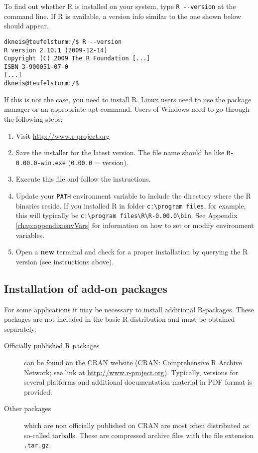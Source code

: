 To find out whether R is installed on your system, type \verb!R --version! at the command line. If R is available, a version info similar to the one shown below should appear.
\begin{lstlisting}[style=shell]
dkneis@teufelsturm:/$ R --version
R version 2.10.1 (2009-12-14)
Copyright (C) 2009 The R Foundation [...]
ISBN 3-900051-07-0
[...]
dkneis@teufelsturm:/$
\end{lstlisting}

If this is not the case, you need to install R. Linux users need to use the package manager or an appropriate apt-command. Users of Windows need to go through the following steps:

\begin{enumerate}
  \item Visit \url{http://www.r-project.org}
  \item Save the installer for the latest version. The file name should be like \verb!R-0.00.0-win.exe! (\verb!0.00.0! = version).
  \item Execute this file and follow the instructions.
  \item Update your \verb!PATH! environment variable to include the directory where the R binaries reside. If you installed R in folder \verb!c:\program files!, for example, this will typically be \verb!c:\program files\R\R-0.00.0\bin!. See Appendix \ref{chap:appendix:envVars} for information on how to set or modify environment variables.
  \item Open a \textbf{new} terminal and check for a proper installation by querying the R version (see instructions above).
\end{enumerate}

\subsection{Installation of add-on packages} \label{sec:extSoft:R:packages}

For some applications it may be necessary to install additional R-packages. These packages are not included in the basic R distribution and must be obtained separately.

\begin{description}
  \item[Officially published R packages] can be found on the CRAN website (CRAN: Comprehensive R Archive Network; see link at \url{http://www.r-project.org}). Typically, versions for several platforms and additional documentation material in PDF format is provided.
  \item[Other packages] which are non officially published on CRAN are most often distributed as so-called tarballs. These are compressed archive files with the file extension \verb!.tar.gz!.
\end{description}

